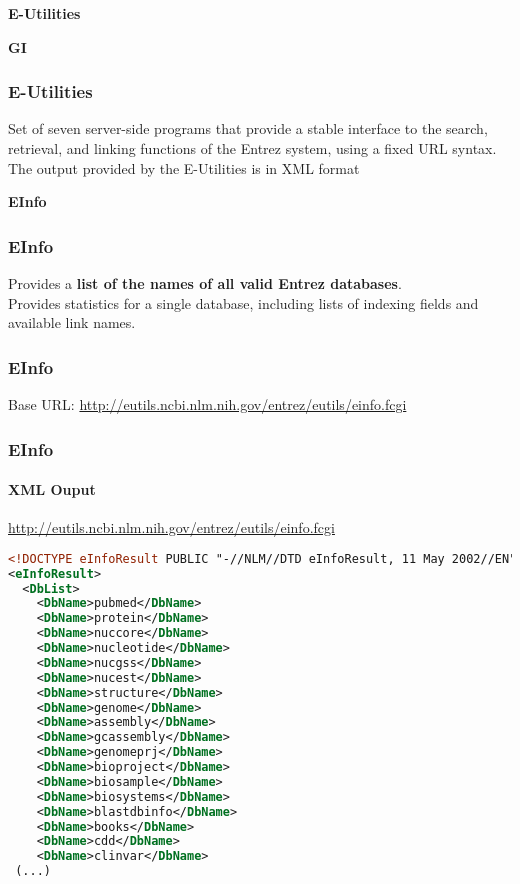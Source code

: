\documentclass{beamer}
\newcommand{\centeredtitle}[1]{
\begin{center}
    \Huge{\bf{#1}}
\end{center}
}
\newcommand{\hugeslide}[1]{
\begin{frame}
\centeredtitle{#1}
\end{frame}
}
\begin{document}
\hugeslide{E-Utilities}

\hugeslide{GI}


\begin{frame}
\frametitle{E-Utilities}
\begin{center}
Set of seven server-side programs that provide a stable interface to the search, retrieval, and linking functions of the Entrez system, using a fixed URL syntax.\\
The output provided by the E-Utilities is in XML format\\
\end{center}
\end{frame}


\hugeslide{EInfo}

\begin{frame}[fragile]
\frametitle{EInfo}
\begin{center}
Provides a {\bf list of the names of all valid Entrez databases}.\\
Provides statistics for a single database, including lists of indexing fields and available link names.
\end{center}
\end{frame}

\begin{frame}[fragile]
\frametitle{EInfo}
Base URL:
\small
\url{http://eutils.ncbi.nlm.nih.gov/entrez/eutils/einfo.fcgi}
\end{frame}



\begin{frame}[fragile]
\frametitle{EInfo}
\framesubtitle{XML Ouput}

\url{http://eutils.ncbi.nlm.nih.gov/entrez/eutils/einfo.fcgi}

\small
\begin{lstlisting}[language=xml]
<!DOCTYPE eInfoResult PUBLIC "-//NLM//DTD eInfoResult, 11 May 2002//EN" "http://www.ncbi.nlm.nih.gov/entrez/query/DTD/eInfo_020511.dtd">
<eInfoResult>
  <DbList>
    <DbName>pubmed</DbName>
    <DbName>protein</DbName>
    <DbName>nuccore</DbName>
    <DbName>nucleotide</DbName>
    <DbName>nucgss</DbName>
    <DbName>nucest</DbName>
    <DbName>structure</DbName>
    <DbName>genome</DbName>
    <DbName>assembly</DbName>
    <DbName>gcassembly</DbName>
    <DbName>genomeprj</DbName>
    <DbName>bioproject</DbName>
    <DbName>biosample</DbName>
    <DbName>biosystems</DbName>
    <DbName>blastdbinfo</DbName>
    <DbName>books</DbName>
    <DbName>cdd</DbName>
    <DbName>clinvar</DbName>
 (...)
\end{lstlisting}
\end{frame}
\end{document}
